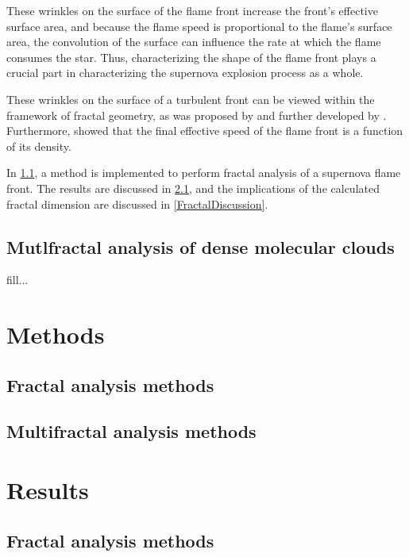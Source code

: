 \documentclass[iop]{emulateapj}
\begin{document}
These wrinkles on the surface of the flame front increase the front's effective surface area, and because the flame speed is proportional to the flame's surface area, the convolution of the surface can influence the rate at which the flame consumes the star. Thus, characterizing the shape of the flame front plays a crucial part in characterizing the supernova explosion process as a whole. 

These wrinkles on the surface of a turbulent front can be viewed within the framework of fractal geometry, as was proposed by \cite{Mandelbrot1975} and further developed by \cite{Timmes1994}. Furthermore, \cite{Timmes1994} showed that the final effective speed of the flame front is a function of its density.

In \textsection \ref{FractalMethods}, a method is implemented to perform fractal analysis of a supernova flame front. The results are discussed in \textsection \ref{FractalResults}, and the implications of the calculated fractal dimension are discussed in \textsection \ref{FractalDiscussion}.

\cite{Blinnikov1996}

\subsection{Mutlfractal analysis of dense molecular clouds}
fill...

\section{Methods}\label{Methods}


\subsection{Fractal analysis methods}\label{FractalMethods}

\subsection{Multifractal analysis methods}\label{MultifractalMethods}

\section{Results}\label{Results}

\subsection{Fractal analysis methods}\label{FractalResults}
\end{document}
